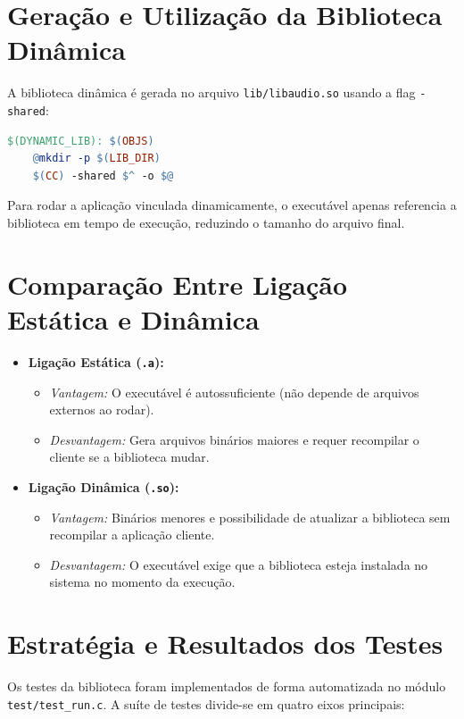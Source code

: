 \documentclass[12pt, a4paper]{article}
\begin{document}
\section{Geração e Utilização da Biblioteca Dinâmica}
A biblioteca dinâmica é gerada no arquivo \texttt{lib/libaudio.so} usando a flag \texttt{-shared}:
\begin{lstlisting}[language=make]
$(DYNAMIC_LIB): $(OBJS)
    @mkdir -p $(LIB_DIR)
    $(CC) -shared $^ -o $@
\end{lstlisting}
Para rodar a aplicação vinculada dinamicamente, o executável apenas referencia a biblioteca em tempo de execução, reduzindo o tamanho do arquivo final.

\section{Comparação Entre Ligação Estática e Dinâmica}
\begin{itemize}
    \item \textbf{Ligação Estática (\texttt{.a}):} 
    \begin{itemize}
        \item \emph{Vantagem:} O executável é autossuficiente (não depende de arquivos externos ao rodar).
        \item \emph{Desvantagem:} Gera arquivos binários maiores e requer recompilar o cliente se a biblioteca mudar.
    \end{itemize}
    \item \textbf{Ligação Dinâmica (\texttt{.so}):} 
    \begin{itemize}
        \item \emph{Vantagem:} Binários menores e possibilidade de atualizar a biblioteca sem recompilar a aplicação cliente.
        \item \emph{Desvantagem:} O executável exige que a biblioteca esteja instalada no sistema no momento da execução.
    \end{itemize}
\end{itemize}

\section{Estratégia e Resultados dos Testes}
Os testes da biblioteca foram implementados de forma automatizada no módulo \texttt{test/test\_run.c}. A suíte de testes divide-se em quatro eixos principais:
\end{document}
